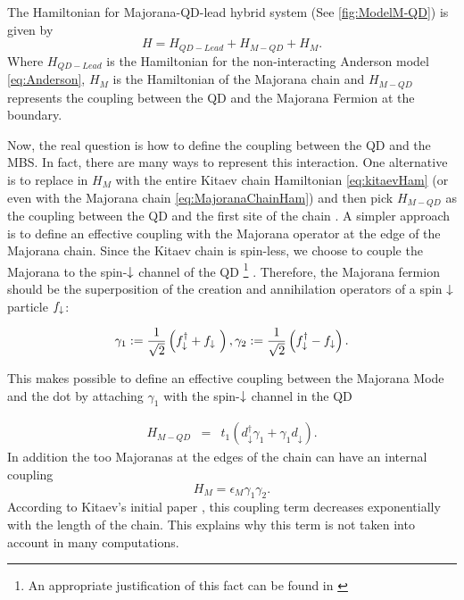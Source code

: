 The Hamiltonian for Majorana-QD-lead hybrid system (See \ref{fig:ModelM-QD}) is  given by
\begin{equation}
    H=H_{QD-Lead}+H_{M-QD}+H_M.
\end{equation}
Where $H_{QD-Lead}$ is the Hamiltonian for the non-interacting Anderson model \eqref{eq:Anderson}, $H_M$ is the Hamiltonian of the Majorana chain and $H_{M-QD}$ represents the coupling between the QD and the Majorana Fermion at the boundary.

Now, the real question is how to define the coupling between the QD and the MBS. In fact, there are many ways to represent this interaction. One alternative is to replace in $H_{M}$ with the entire Kitaev chain Hamiltonian \eqref{eq:kitaevHam} (or  even with the  Majorana chain \eqref{eq:MajoranaChainHam}) and then pick $H_{M-QD}$ as the coupling between the QD and the first site of the chain \cite{vernek_subtle_2014}.  A simpler approach is  to define an effective coupling with the Majorana operator at the edge of the Majorana chain. Since the Kitaev chain is spin-less, we choose to couple the Majorana to the spin-$\downarrow$ channel of the QD \footnote{An appropriate justification of this fact can be found in \cite{ruiz-tijerina_interaction_2015}} . Therefore, the Majorana fermion should be the superposition of the creation and annihilation operators of a spin $\downarrow$ particle $f_\downarrow$:

$$\gamma_1 := \frac{1}{\sqrt{2}} \left( f^\dagger_{\downarrow} + f_{\downarrow}\ \right) , \gamma_2 := \frac{1}{\sqrt{2}} \left( f^\dagger_{\downarrow} - f_{\downarrow} \right).$$

This makes possible to define an effective coupling between the Majorana Mode and the dot by attaching $\gamma_1$ with the spin-$\downarrow$ channel in the QD

\begin{eqnarray}
H_{M-QD} & = &  t_1 \left(d_{\downarrow}^{\dagger}\gamma_{1}+\gamma_{1}d_{\downarrow}\right) .
\label{eq:MajoranaCoupling}
\end{eqnarray}
\noindent In addition the too Majoranas at the edges of the chain can have an internal coupling 
\begin{equation}
H_M = \epsilon_M  \gamma_1\gamma_2. 
\end{equation}
\noindent According to Kitaev's initial paper \cite{kitaev_unpaired_2001}, this coupling term decreases exponentially with the length of the chain. This explains why this term is not taken into account in many computations. 


